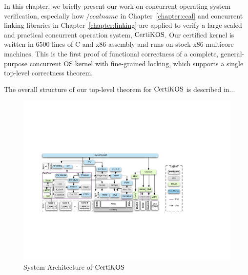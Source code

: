 In this chapter, we briefly present our work on concurrent operating system verification, especially 
how $/ccalname$ in Chapter~\ref{chapter:ccal} and concurrent linking libraries in Chapter~\ref{chapter:linking} are applied 
to verify a large-scaled and practical concurrent operation system, $\mathrm{CertiKOS}$.
Our certified kernel is written in 6500 lines of C and x86 assembly
and runs on stock x86 multicore machines. This is
the first proof of functional correctness of a complete,
general-purpose concurrent OS kernel with fine-grained locking,
which supports a single top-level correctness theorem. 
%
%

The overall structure of our top-level theorem for $\mathrm{CertiKOS}$ is described in...


\begin{figure}
\includegraphics[width=\textwidth]{figs/certikos/sysarch}
\caption{System Architecture of $\mathrm{CertiKOS}$}
\label{fig:chapter:certikos:system-architecture-of-certikos}
\end{figure}

